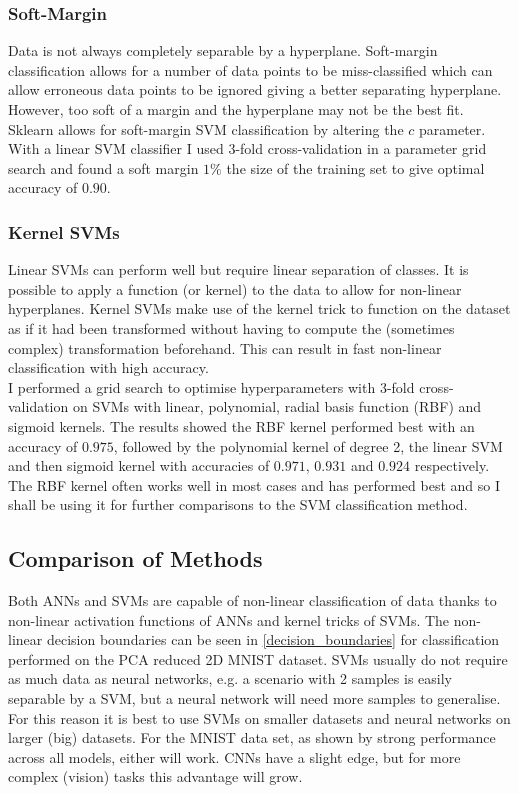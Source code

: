 \documentclass[11pt]{article}
\begin{document}
\subsubsection{Soft-Margin}

Data is not always completely separable by a hyperplane. Soft-margin classification allows for a number of data points to be miss-classified which can allow erroneous data points to be ignored giving a better separating hyperplane. However, too soft of a margin and the hyperplane may not be the best fit. Sklearn allows for soft-margin SVM classification by altering the $c$ parameter. With a linear SVM classifier I used 3-fold cross-validation in a parameter grid search and found a soft margin $1\%$ the size of the training set to give optimal accuracy of $0.90$.

\subsubsection{Kernel SVMs}

Linear SVMs can perform well but require linear separation of classes. It is possible to apply a function (or kernel) to the data to allow for non-linear hyperplanes. Kernel SVMs make use of the kernel trick to function on the dataset as if it had been transformed without having to compute the (sometimes complex) transformation beforehand. This can result in fast non-linear classification with high accuracy. \\

I performed a grid search to optimise hyperparameters with 3-fold cross-validation on SVMs with linear, polynomial, radial basis function (RBF) and sigmoid kernels. The results showed the RBF kernel performed best with an accuracy of $0.975$, followed by the polynomial kernel of degree 2, the linear SVM and then sigmoid kernel with accuracies of $0.971$, $0.931$ and $0.924$ respectively. The RBF kernel often works well in most cases and has performed best and so I shall be using it for further comparisons to the SVM classification method.

\subsection{Comparison of Methods}

Both ANNs and SVMs are capable of non-linear classification of data thanks to non-linear activation functions of ANNs and kernel tricks of SVMs. The non-linear decision boundaries can be seen in \ref{decision_boundaries} for classification performed on the PCA reduced 2D MNIST dataset. SVMs usually do not require as much data as neural networks, e.g. a scenario with 2 samples is easily separable by a SVM, but a neural network will need more samples to generalise. For this reason it is best to use SVMs on smaller datasets and neural networks on larger (big) datasets. For the MNIST data set, as shown by strong performance across all models, either will work. CNNs have a slight edge, but for more complex (vision) tasks this advantage will grow.
\end{document}

